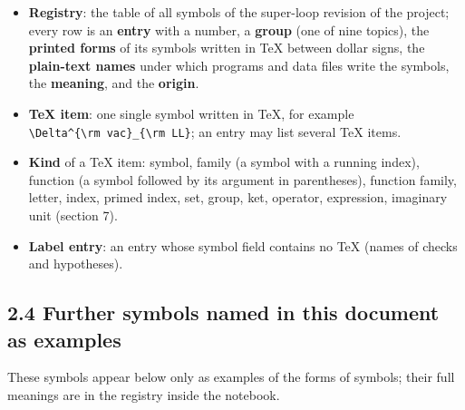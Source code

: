 \documentclass[
  10pt,
]{article}
\providecommand{\tightlist}{%
  \setlength{\itemsep}{0pt}\setlength{\parskip}{0pt}}
\begin{document}
\begin{itemize}
\tightlist
\item
  \textbf{Registry}: the table of all symbols of the super-loop revision
  of the project; every row is an \textbf{entry} with a number, a
  \textbf{group} (one of nine topics), the \textbf{printed forms} of its
  symbols written in TeX between dollar signs, the \textbf{plain-text
  names} under which programs and data files write the symbols, the
  \textbf{meaning}, and the \textbf{origin}.
\item
  \textbf{TeX item}: one single symbol written in TeX, for example
  \texttt{\textbackslash{}Delta\^{}\{\textbackslash{}rm\ vac\}\_\{\textbackslash{}rm\ LL\}};
  an entry may list several TeX items.
\item
  \textbf{Kind} of a TeX item: symbol, family (a symbol with a running
  index), function (a symbol followed by its argument in parentheses),
  function family, letter, index, primed index, set, group, ket,
  operator, expression, imaginary unit (section 7).
\item
  \textbf{Label entry}: an entry whose symbol field contains no TeX
  (names of checks and hypotheses).
\end{itemize}

\hypertarget{further-symbols-named-in-this-document-as-examples}{%
\subsection{2.4 Further symbols named in this document as
examples}\label{further-symbols-named-in-this-document-as-examples}}

These symbols appear below only as examples of the forms of symbols;
their full meanings are in the registry inside the notebook.
\end{document}
